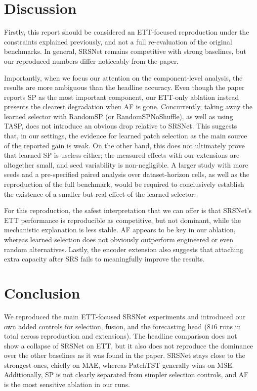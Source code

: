 \documentclass[10pt]{article}
\begin{document}
\section{Discussion}


Firstly, this report should be considered an ETT-focused reproduction under 
the constraints explained previously, and not a full re-evaluation of the original
benchmarks. In general, SRSNet remains competitive with strong baselines, but 
our reproduced numbers differ noticeably from the paper.

Importantly, when we focus our attention on the component-level analysis, the results
are more ambiguous than the headline accuracy. Even though the paper reports SP as the most 
important component, our ETT-only ablation instead presents the clearest degradation when AF is
gone. Concurrently, taking away the learned selector with RandomSP (or RandomSPNoShuffle), as well
as using TASP, does not introduce an obvious drop relative to SRSNet. This suggests that, in our settings,
the evidence for learned patch selection as the main source of the reported gain is weak.
On the other hand, this does not ultimately prove that learned SP is useless either; the measured
effects with our extensions are altogether small, and seed variability is non-negligible. A larger study
with more seeds and a pre-specified paired analysis over dataset-horizon cells, as well as the reproduction
of the full benchmark, would be required to conclusively establish the existence of a smaller but real effect
of the learned selector.


For this reproduction, the safest interpretation that we can offer is that SRSNet's ETT performance is reproducible as 
competitive, but not dominant, while the mechanistic explanation is less stable. AF appears to be key in our ablation, 
whereas learned selection does not obviously outperform engineered or even random alternatives. Lastly, the encoder extension
also suggests that attaching extra capacity after SRS fails to meaningfully improve the results.


\section{Conclusion}

We reproduced the main ETT-focused SRSNet experiments and introduced our own added controls for selection, fusion, and the
forecasting head ($816$ runs in total across reproduction and extensions). The headline comparison does not show a collapse of
SRSNet on ETT, but it also does not reproduce the dominance over the other baselines as it was found in the paper. SRSNet stays
close to the strongest ones, chiefly on MAE, whereas PatchTST generally wins on MSE. Additionally, SP is not clearly separated
from simpler selection controls, and AF is the most sensitive ablation in our runs.
\end{document}
